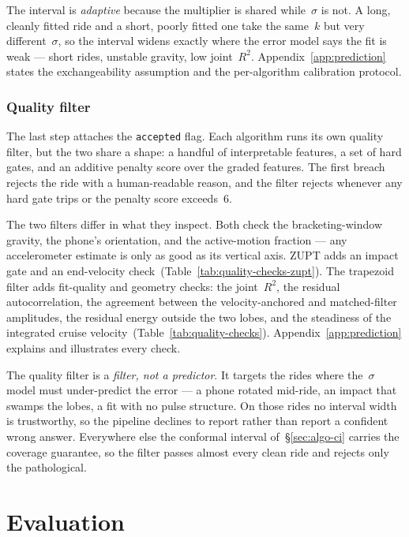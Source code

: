\documentclass[manuscript,review,screen]{acmart}
\begin{document}
The interval is \emph{adaptive} because the multiplier is shared
while~$\sigma$ is not.  A long, cleanly fitted ride and a short,
poorly fitted one take the same~$k$ but very different~$\sigma$, so
the interval widens exactly where the error model says the fit is
weak --- short rides, unstable gravity, low joint~$R^{2}$.
Appendix~\ref{app:prediction} states the exchangeability assumption
and the per-algorithm calibration protocol.

\subsubsection{Quality filter}
\label{sec:algo-quality}

The last step attaches the \texttt{accepted} flag.  Each algorithm
runs its own quality filter, but the two share a shape: a handful of
interpretable features, a set of hard gates, and an additive penalty
score over the graded features.  The first breach rejects the ride
with a human-readable reason, and the filter rejects whenever any
hard gate trips or the penalty score exceeds~$6$.

The two filters differ in what they inspect.  Both check the
bracketing-window gravity, the phone's orientation, and the
active-motion fraction --- any accelerometer estimate is only as good
as its vertical axis.  ZUPT adds an impact gate and an end-velocity
check~(Table~\ref{tab:quality-checks-zupt}).  The trapezoid filter
adds fit-quality and geometry checks: the joint~$R^{2}$, the residual
autocorrelation, the agreement between the velocity-anchored and
matched-filter amplitudes, the residual energy outside the two lobes,
and the steadiness of the integrated cruise
velocity~(Table~\ref{tab:quality-checks}).
Appendix~\ref{app:prediction} explains and illustrates every check.

The quality filter is a \emph{filter, not a predictor}.  It targets
the rides where the~$\sigma$ model must under-predict the error --- a
phone rotated mid-ride, an impact that swamps the lobes, a fit with
no pulse structure.  On those rides no interval width is trustworthy,
so the pipeline declines to report rather than report a confident
wrong answer.  Everywhere else the conformal interval
of~\S\ref{sec:algo-ci} carries the coverage guarantee, so the filter
passes almost every clean ride and rejects only the pathological.

\section{Evaluation}
\label{sec:evaluation}
\end{document}
